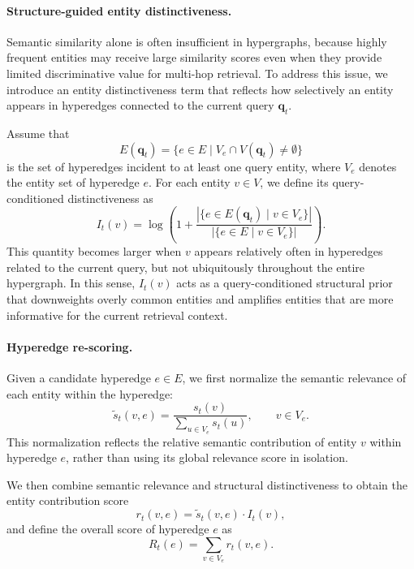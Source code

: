 \paragraph{Structure-guided entity distinctiveness.}
Semantic similarity alone is often insufficient in hypergraphs, because highly frequent entities may receive large similarity scores even when they provide limited discriminative value for multi-hop retrieval.
To address this issue, we introduce an entity distinctiveness term that reflects how selectively an entity appears in hyperedges connected to the current query $\boldsymbol{q}_t$.

Assume that
\begin{equation}
    E(\mathbf{q}_t) = \{ e \in E \mid V_e \cap V(\mathbf{q}_t) \neq \emptyset \}
\end{equation}
is the set of hyperedges incident to at least one query entity, where $V_e$ denotes the entity set of hyperedge $e$.
For each entity $v \in V$, we define its query-conditioned distinctiveness as
\begin{equation}
    I_t(v) = \log \left(
    1 +
    \frac{\left|\{ e \in E(\mathbf{q}_t) \mid v \in V_e \}\right|}
         {\left|\{ e \in E \mid v \in V_e \}\right|}
    \right).
\end{equation}
This quantity becomes larger when $v$ appears relatively often in hyperedges related to the current query, but not ubiquitously throughout the entire hypergraph.
In this sense, $I_t(v)$ acts as a query-conditioned structural prior that downweights overly common entities and amplifies entities that are more informative for the current retrieval context.

\paragraph{Hyperedge re-scoring.}
Given a candidate hyperedge $e \in E$, we first normalize the semantic relevance of each entity within the hyperedge:
\begin{equation}
    \tilde{s}_t(v,e) =
    \frac{s_t(v)}{\sum_{u \in V_e} s_t(u)}, \qquad v \in V_e.
\end{equation}
This normalization reflects the relative semantic contribution of entity $v$ within hyperedge $e$, rather than using its global relevance score in isolation.

We then combine semantic relevance and structural distinctiveness to obtain the entity contribution score
\begin{equation}
    r_t(v,e) = \tilde{s}_t(v,e)\cdot I_t(v),
\end{equation}
and define the overall score of hyperedge $e$ as
\begin{equation}
    R_t(e) = \sum_{v \in V_e} r_t(v,e).
\end{equation}

